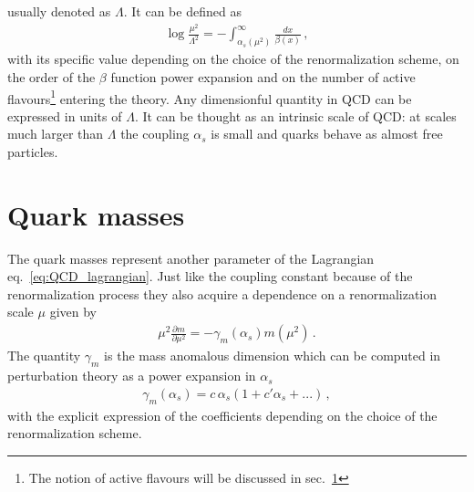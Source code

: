 usually denoted as $\Lambda$.
It can be defined as
\begin{align}
    \log\frac{\mu^2}{\Lambda^2} = -\int_{\alpha_s\left(\mu^2\right)}^{\infty} \frac{dx}{\beta\left(x\right)}\,,
\end{align}
with its specific value depending on the choice of the renormalization scheme, on the order
of the $\beta$ function power expansion and on the number of active flavours\footnote{The notion of active flavours will
be discussed in sec.~\ref{sec:quark_masses}} entering the theory.
Any dimensionful quantity in QCD can be expressed
in units of $\Lambda$.
It can be thought as an intrinsic scale of QCD:
at scales much larger than $\Lambda$ the coupling $\alpha_s$ is small and
quarks behave as almost free particles.

\section{Quark masses}
\label{sec:quark_masses}
The quark masses represent another parameter of the Lagrangian eq.~\eqref{eq:QCD_lagrangian}.
Just like the coupling constant because of the renormalization process they also acquire a
dependence on a renormalization scale $\mu$ given by 
\begin{align}
    \label{eq:renormalization_mass}
    \mu^2\frac{\partial m }{\partial \mu^2} = - \gamma_m\left(\alpha_s\right)m\left(\mu^2\right)\,.
\end{align}
The quantity $\gamma_m$ is the mass anomalous dimension which can be computed in perturbation theory as
a power expansion in $\alpha_s$
\begin{align}
    \gamma_m\left(\alpha_s\right) = c\,\alpha_s\left(1+c'\alpha_s + ...\right)\,,
\end{align}
with the explicit expression of the coefficients depending on the choice of the renormalization scheme.

